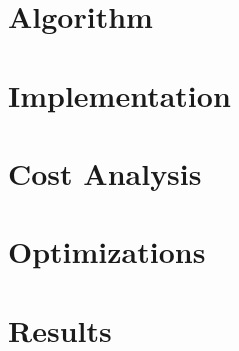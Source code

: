 


  \begin{frame}[plain]
  \titlepage
  \end{frame}
  \section{Algorithm}
  \setcounter{subsection}{1}
  
  \section{Implementation}
  \setcounter{subsection}{1}
  
  \section{Cost Analysis}
  \setcounter{subsection}{1}
  
  \section{Optimizations}
  \setcounter{subsection}{1}
  
  \section{Results}
  \setcounter{subsection}{1}
  
